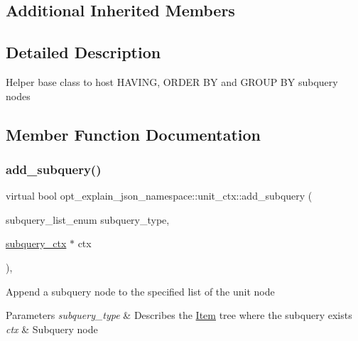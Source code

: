 \subsection*{Additional Inherited Members}


\subsection{Detailed Description}
Helper base class to host H\+A\+V\+I\+NG, O\+R\+D\+ER BY and G\+R\+O\+UP BY subquery nodes 

\subsection{Member Function Documentation}
\mbox{\label{classopt__explain__json__namespace_1_1unit__ctx_a157b828a313f01ec8bd7c4a53644f6b2}} 
\subsubsection{\texorpdfstring{add\+\_\+subquery()}{add\_subquery()}}
{\footnotesize\ttfamily virtual bool opt\+\_\+explain\+\_\+json\+\_\+namespace\+::unit\+\_\+ctx\+::add\+\_\+subquery (\begin{DoxyParamCaption}\item[{subquery\+\_\+list\+\_\+enum}]{subquery\+\_\+type,  }\item[{\mbox{\hyperlink{classopt__explain__json__namespace_1_1subquery__ctx}{subquery\+\_\+ctx}} $\ast$}]{ctx }\end{DoxyParamCaption})\hspace{0.3cm}{\ttfamily [inline]}, {\ttfamily [virtual]}}

Append a subquery node to the specified list of the unit node


\begin{DoxyParams}{Parameters}
{\em subquery\+\_\+type} & Describes the \mbox{\hyperlink{classItem}{Item}} tree where the subquery exists \\
\hline
{\em ctx} & Subquery node\\
\hline
\end{DoxyParams}

